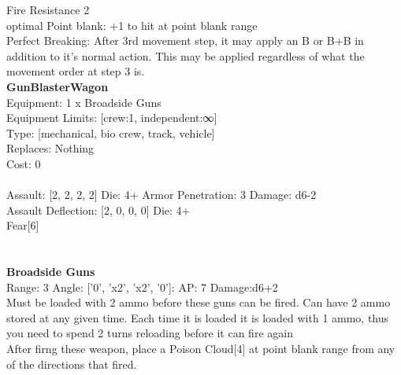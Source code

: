 \noindent Fire Resistance 2\\ 
optimal Point blank: +1 to hit at point blank range\\ 
Perfect Breaking: After 3rd movement step, it may apply an B or B+B in addition to it's normal action. This may be applied regardless of what the movement order at step 3 is.\\ 


{\bf GunBlasterWagon } \\
Equipment: 1 x Broadside Guns \\
Equipment Limits: [crew:1, independent:∞] \\
Type: [mechanical, bio crew, track, vehicle] \\
Replaces: Nothing \\
Cost: 0\\
\ \\
Assault: [2, 2, 2, 2] Die: 4+ Armor Penetration: 3 Damage: d6-2 \\
Assault Deflection: [2, 0, 0, 0] Die: 4+\\
\indent Fear[6]\\ 
 
\ \\

\ \\
{\bf Broadside Guns } \\



Range: 3  Angle: ['0', 'x2', 'x2', '0']: AP: 7 Damage:d6+2 \\
Must be loaded with 2 ammo before these guns can be fired. Can have 2 ammo stored at any given time. Each time it is loaded it is loaded with 1 ammo, thus you need to spend 2 turns reloading before it can fire again\\ 
After firng these weapon, place a Poison Cloud[4] at point blank range from any of the directions that fired.\\ 




 
\ \\




